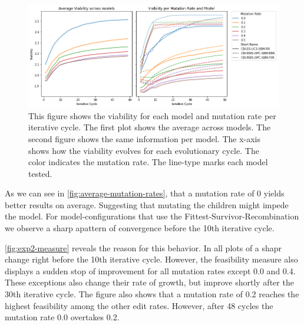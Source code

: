 \documentclass[./../../paper.tex]{subfiles}
\begin{document}

\begin{figure}[htbp]
    \centering
    \includegraphics[width=\textwidth]{figures/generated/exp2_viability_by_mrate_model.png}
    \caption{This figure shows the viability for each model and mutation rate per iterative cycle. The first plot shows the average across models. The second figure shows the same information per model. The x-axis shows how the viability evolves for each evolutionary cycle. The color indicates the mutation rate. The line-type marks each model tested.}
    \label{fig:average-mutation-rates}
\end{figure}


\noindent As we can see in \autoref{fig:average-mutation-rates}, that a mutation rate of 0 yields better results on average. Suggesting that mutating the children might impede the model. 
For model-configurations that use the Fittest-Survivor-Recombination we observe a sharp apattern of convergence before the 10th iterative cycle.  



\autoref{fig:exp2-measure} reveals the reason for this behavior.
In all plots of a shapr change right before the 10th iterative cycle. However, the feasibility measure also displays a sudden stop of improvement for all mutation rates except 0.0 and 0.4. These exceptions also change their rate of growth, but improve shortly after the 30th iterative cycle.  The figure also shows that a mutation rate of 0.2 reaches the highest feasibility among the other edit rates. However, after 48 cycles the mutation rate 0.0 overtakes 0.2.     
\end{document}
